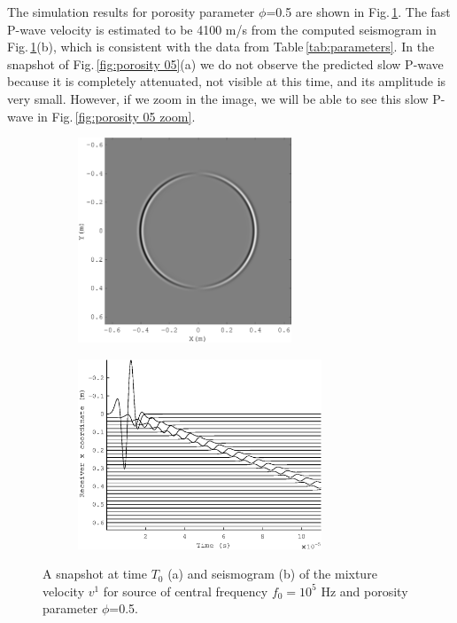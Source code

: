 \documentclass[3p,times,table]{article}
\begin{document}
The simulation results for  porosity parameter $\phi$=0.5 are shown in 
Fig.\,\ref{fig:porosity 05}. The fast P-wave velocity is estimated to be 4100 m/s 
from the
computed seismogram in  Fig.\,\ref{fig:porosity 05}(b), which is consistent with 
the data from Table\,\ref{tab:parameters}. In the snapshot of Fig.\,\ref{fig:porosity 
05}(a) we do not observe the predicted slow P-wave because it is  completely attenuated, 
not visible at this time, and its amplitude is 
very 
small. However, if we 
zoom in the image, we will be able to see this slow P-wave in 
Fig.\,\ref{fig:porosity 05 zoom}.
\begin{figure}%
\begin{subfigure}{0.5\linewidth}
\includegraphics[draft=false,width=0.7\textwidth]{Figures/wave_alfa_s_05}
\caption{}
\end{subfigure}
\hfill
\begin{subfigure}{0.5\linewidth}
\includegraphics[draft=false,width=0.8\textwidth]{Figures/alfa_s_05}
\caption{}
\end{subfigure}%
\caption{A snapshot at time $T_{0}$ (a) and seismogram (b) of the mixture 
velocity $v^1$  for source of central frequency $f_{0} =10^{5} $ Hz  and 
porosity 
parameter $\phi$=0.5.}
\label{fig:porosity 05}
\end{figure}
\end{document}
